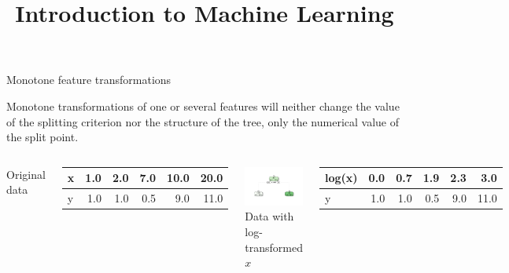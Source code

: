 \documentclass[11pt,compress,t,notes=noshow, xcolor=table]{beamer}
\title{Introduction to Machine Learning}
\begin{document}

\begin{vbframe}{Monotone feature transformations}

Monotone transformations of one or several features will neither change the value of the splitting criterion nor the structure of the tree,  only the numerical value of the split point.
\vspace{0.5cm}
\begin{columns}[T]
Original data
\begin{knitrout}\scriptsize
{}\color{fgcolor}
\begin{tabular}{l|r|r|r|r|r}
\hline
x & 1.0 & 2.0 & 7.0 & 10.0 & 20.0\\
\hline
y & 1.0 & 1.0 & 0.5 & 9.0 & 11.0\\
\hline
\end{tabular}


\end{knitrout}
\includegraphics[width = \textwidth]{figure/cart_splitcomp_1}
Data with log-transformed $x$
\begin{knitrout}\scriptsize
{}\color{fgcolor}
\begin{tabular}{l|r|r|r|r|r}
\hline
log(x) & 0.0 & 0.7 & 1.9 & 2.3 & 3.0\\
\hline
y & 1.0 & 1.0 & 0.5 & 9.0 & 11.0\\
\hline
\end{tabular}



\end{knitrout}
\end{columns}
\end{vbframe}
\end{document}
